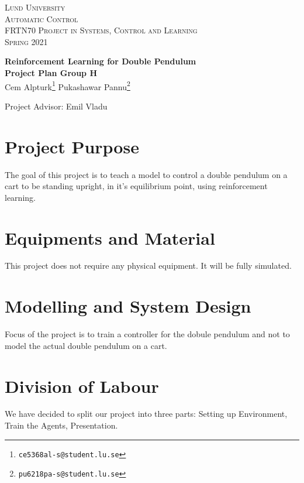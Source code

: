 \documentclass{article}
\begin{document}
\begin{titlepage}
  \begin{flushleft}\scshape
    Lund University\\
    Automatic Control\\[\smallskipamount]
    FRTN70 Project in Systems, Control and Learning\\
    Spring 2021
  \end{flushleft}
  \vspace*{0pt plus 0.3fill}
  \begin{center}
    \huge \textbf{Reinforcement Learning for Double Pendulum}\\[4mm]     
    \large\textbf{Project Plan Group H}\\[5mm]
         Cem Alpturk\footnote{\texttt{ce5368al-s@student.lu.se}}\quad
         Pukashawar Pannu\footnote{\texttt{pu6218pa-s@student.lu.se}}
  \end{center}
\begin{center}
    Project Advisor: Emil Vladu
\end{center}
\vfill
\end{titlepage}        

\section{Project Purpose}
The goal of this project is to teach a model to control a double pendulum on a cart to be standing upright, in it's equilibrium point, using reinforcement learning.

\section{Equipments and Material} \label{sec:equipment}
This project does not require any physical equipment.
It will be fully simulated.

\section{Modelling and System Design}
Focus of the project is to train a controller for the dobule pendulum and not to model the actual double pendulum on a cart.


\section{Division of Labour} \label{sec:division}
We have decided to split our project into three parts: Setting up Environment, Train the Agents, Presentation. 
\end{document}

